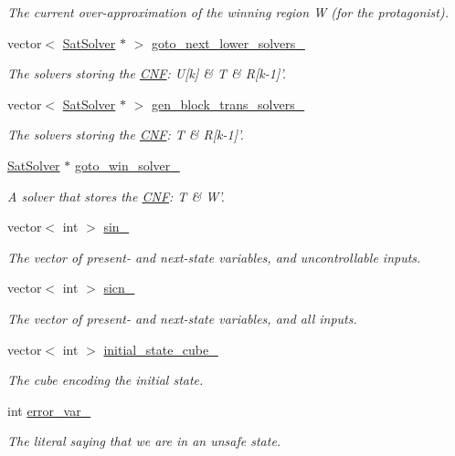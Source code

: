 \begin{DoxyCompactItemize}
\begin{DoxyCompactList}\small\item\em The current over-\/approximation of the winning region W (for the protagonist). \end{DoxyCompactList}\item 
vector$<$ \hyperlink{classSatSolver}{Sat\-Solver} $\ast$ $>$ \hyperlink{classIFM13Explorer_aaa5c23d99524b6a0190212bd7abae6dd}{goto\-\_\-next\-\_\-lower\-\_\-solvers\-\_\-}
\begin{DoxyCompactList}\small\item\em The solvers storing the \hyperlink{classCNF}{C\-N\-F}\-: U\mbox{[}k\mbox{]} \& T \& R\mbox{[}k-\/1\mbox{]}'. \end{DoxyCompactList}\item 
vector$<$ \hyperlink{classSatSolver}{Sat\-Solver} $\ast$ $>$ \hyperlink{classIFM13Explorer_a7cec81136159600cb4b65bbb8db0c8a5}{gen\-\_\-block\-\_\-trans\-\_\-solvers\-\_\-}
\begin{DoxyCompactList}\small\item\em The solvers storing the \hyperlink{classCNF}{C\-N\-F}\-: T \& R\mbox{[}k-\/1\mbox{]}'. \end{DoxyCompactList}\item 
\hyperlink{classSatSolver}{Sat\-Solver} $\ast$ \hyperlink{classIFM13Explorer_acfe8f5c31b916cf5a6973069c522ef94}{goto\-\_\-win\-\_\-solver\-\_\-}
\begin{DoxyCompactList}\small\item\em A solver that stores the \hyperlink{classCNF}{C\-N\-F}\-: T \& W'. \end{DoxyCompactList}\item 
vector$<$ int $>$ \hyperlink{classIFM13Explorer_a972f36d23d8990dde764f4ee877620fa}{sin\-\_\-}
\begin{DoxyCompactList}\small\item\em The vector of present-\/ and next-\/state variables, and uncontrollable inputs. \end{DoxyCompactList}\item 
vector$<$ int $>$ \hyperlink{classIFM13Explorer_ad04fb2b668ee928c9c38c61ec1e168ef}{sicn\-\_\-}
\begin{DoxyCompactList}\small\item\em The vector of present-\/ and next-\/state variables, and all inputs. \end{DoxyCompactList}\item 
vector$<$ int $>$ \hyperlink{classIFM13Explorer_a8fed8ac3d0dc575f8803878f23df7815}{initial\-\_\-state\-\_\-cube\-\_\-}
\begin{DoxyCompactList}\small\item\em The cube encoding the initial state. \end{DoxyCompactList}\item 
int \hyperlink{classIFM13Explorer_a222a8be4c6ce2e54488aabb9b882f8c9}{error\-\_\-var\-\_\-}
\begin{DoxyCompactList}\small\item\em The literal saying that we are in an unsafe state. \end{DoxyCompactList}\end{DoxyCompactItemize}
